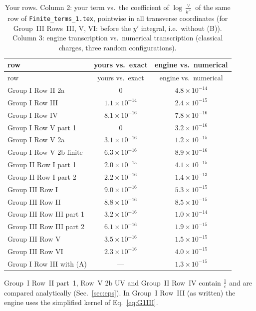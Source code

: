 \documentclass[10pt]{article}
\numberwithin{equation}{section}
\begin{document}
\begin{longtable}{@{}lcc@{}}
\caption{Your rows. Column 2: your term vs.\ the coefficient of $\log\frac{\vee}{k^+}$ of the same row of \texttt{Finite\_terms\_1.tex}, pointwise in all transverse coordinates (for Group~III Rows~III, V, VI: before the $y'$ integral, i.e.\ without (B)). Column 3: engine transcription vs.\ numerical transcription (classical charges, three random configurations).}\label{tab:rows}\\
\toprule row & yours vs.\ exact & engine vs.\ numerical\\\midrule\endfirsthead
\toprule row & yours vs.\ exact & engine vs.\ numerical\\\midrule\endhead
Group I Row II 2a & $0$ & $4.8\times10^{-14}$\\
Group I Row III & $1.1\times10^{-14}$ & $2.4\times10^{-15}$\\
Group I Row IV & $8.1\times10^{-16}$ & $7.8\times10^{-16}$\\
Group I Row V part 1 & $0$ & $3.2\times10^{-16}$\\
Group I Row V 2a & $3.1\times10^{-16}$ & $1.2\times10^{-15}$\\
Group I Row V 2b finite & $6.3\times10^{-16}$ & $8.9\times10^{-16}$\\
Group II Row I part 1 & $2.0\times10^{-15}$ & $4.1\times10^{-15}$\\
Group II Row I part 2 & $2.2\times10^{-16}$ & $1.4\times10^{-13}$\\
Group III Row I & $9.0\times10^{-16}$ & $5.3\times10^{-15}$\\
Group III Row II & $8.8\times10^{-16}$ & $8.5\times10^{-15}$\\
Group III Row III part 1 & $3.2\times10^{-16}$ & $1.0\times10^{-14}$\\
Group III Row III part 2 & $6.1\times10^{-16}$ & $1.9\times10^{-15}$\\
Group III Row V & $3.5\times10^{-16}$ & $1.5\times10^{-15}$\\
Group III Row VI & $2.3\times10^{-16}$ & $4.0\times10^{-15}$\\
Group I Row III with (A) & --- & $1.3\times10^{-15}$\\
\bottomrule
\end{longtable}
\noindent Group~I Row~II part~1, Row~V 2b UV and Group~II Row~IV contain $\frac1\epsilon$ and are compared analytically (Sec.~\ref{sec:eps}). In Group~I Row~III (as written) the engine uses the simplified kernel of Eq.~\eqref{eq:G1III}.
\end{document}
